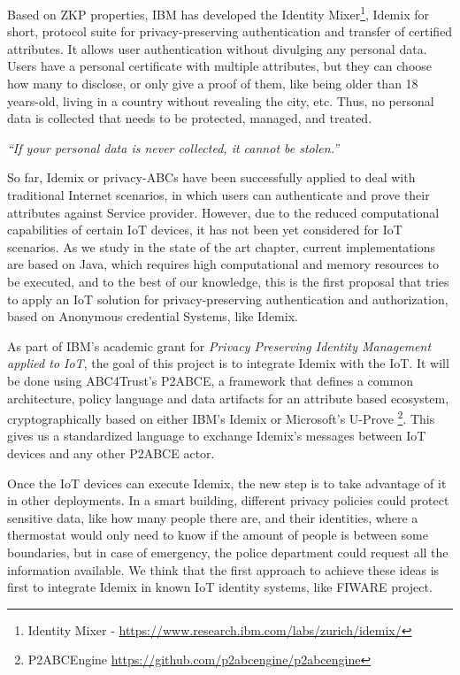 Based on ZKP properties, IBM has developed the Identity Mixer\footnote{Identity Mixer - \url{https://www.research.ibm.com/labs/zurich/idemix/}}, Idemix for short, protocol suite for privacy-preserving authentication and transfer of certified attributes. It allows user authentication without divulging any personal data. Users have a personal certificate with multiple attributes, but they can choose how many to disclose, or only give a proof of them, like being older than 18 years-old, living in a country without revealing the city, etc. Thus, no personal data is collected that needs to be protected, managed, and treated.

\begin{center}
	\textit{``If your personal data is never collected, it cannot be stolen.''}
\end{center}

So far, Idemix or privacy-ABCs have been successfully applied to deal with traditional Internet scenarios, in which users can authenticate and prove their attributes against Service provider. However, due to the reduced computational capabilities of certain IoT devices, it has not been yet considered for IoT scenarios. As we study in the state of the art chapter, current implementations are based on Java, which requires high computational and memory resources to be executed, and to the best of our knowledge, this is the first proposal that tries to apply an IoT solution for privacy-preserving authentication and authorization, based on Anonymous credential Systems, like Idemix.


As part of IBM's academic grant for \textit{Privacy Preserving Identity Management applied to IoT}, the goal of this project is to integrate Idemix with the IoT. It will be done using ABC4Trust's \acf{P2ABCE}, a framework that defines a common architecture, policy language and data artifacts for an attribute based ecosystem, cryptographically based on either IBM's Idemix or Microsoft's U-Prove \footnote{P2ABCEngine \url{https://github.com/p2abcengine/p2abcengine}}. This gives us a standardized language to exchange Idemix's messages between IoT devices and any other P2ABCE actor.

Once the IoT devices can execute Idemix, the new step is to take advantage of it in other deployments. In a smart building, different privacy policies could protect sensitive data, like how many people there are, and their identities, where a thermostat would only need to know if the amount of people is between some boundaries, but in case of emergency, the police department could request all the information available. We think that the first approach to achieve these ideas is first to integrate Idemix in known IoT identity systems, like FIWARE project. 

